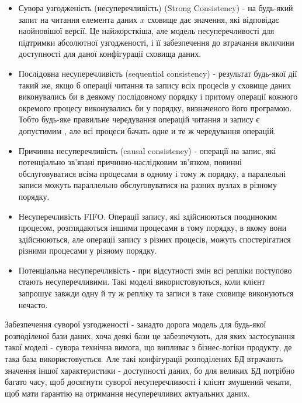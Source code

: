 \documentclass[14pt]{vakthesis}
\begin{document}
\begin{itemize}
\item Сувора узгодженість (несуперечливість) (Strong Consistency) - на будь-який запит на читання елемента даних $x$ сховище дає значення, які відповідає наойновішої версії. Це найжорсткіша, але модель несуперечливості для підтримки абсолютної узгодженості, і її забезпечення до втрачання вкличини доступності для даної конфігурації сховища даних.

\item Послідовна несуперечливість (sequential consistency) - результат будь-якої дії такий же, якщо б операції читання та запису всіх процесів у сховище даних виконувались би в деякому послідовному порядку і притому операції кожного окремого процесу виконувались би у порядку, визначеного його програмою. Тобто будь-яке правильне чередування операцій читання и запису є допустимим , але всі процеси бачать одне и те ж чередування операцій.

\item Причинна несуперечливість (causal consistency) - операції на запис, які потенціально зв'язані причинно-наслідковим зв'язком, повинні  обслуговуватися всіма процесами в одному і тому ж порядку, а паралельні записи можуть параллельно обслуговуватися на разних вузлах в різному порядку.

\item Несуперечливість FIFO. Операції запису, які здійснюються поодиноким процесом, розглядаються іншими процесами в тому порядку, в якому вони здійснюються, але операції запису з різних процесів, можуть спостерігатися різними процесами у різному порядку.

\item Потенціальна несуперечливість - при відсутності змін всі репліки поступово стають несуперечливими. Такі моделі використовуються, коли клієнт запрошує завжди одну й ту ж репліку та записи в таке сховище виконуються нечасто.


\end{itemize}

Забезпечення суворої узгодженості - занадто дорога модель для будь-якої розподіленої бази даних, хоча деякі бази це забезпечують, для яких застосування такої моделі - сувора технічна вимога, що випливає з бізнес-логіки продукту, де така база використовується.
Але такі конфігурації розподілених БД втрачають значення іншої характеристики - доступності даних, бо для великих БД потрібно багато часу, щоб досягнути суворої несуперечливості і клієнт змушений чекати, щоб мати гарантію на отримання несуперечливих актуальних даних.
\end{document}

